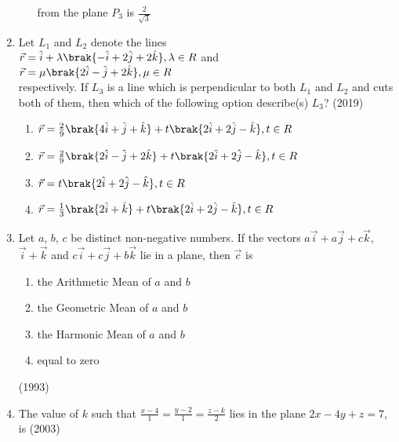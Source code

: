 \begin{enumerate}[label=\thesubsection.\arabic*.,ref=\thesubsection.\theenumi]
\begin{enumerate}
				from the plane $P_3$ is $\frac{2}{\sqrt{3}}$
		\end{enumerate}
	\item Let $L_1$ and $L_2$ denote the lines\\ $\vec{r}=\hat{i}+\lambda\brak{-\hat{i}+2\hat{j}+2\hat{k}}, \lambda \in R$ and \\
		$\vec{r}=\mu \brak{2\hat{i}-\hat{j}+2\hat{k}}, \mu \in R$\\ respectively. If $L_3$ is a line which is perpendicular to both $L_1$ and $L_2$ and cuts both of them, then which of 
		the following option describe(s) $L_3$? \hfill{(2019)}
		\begin{enumerate}
			\item $\vec{r}=\frac{2}{9}\brak{4\hat{i}+\hat{j}+\hat{k}}+t\brak{2\hat{i}+2\hat{j}-\hat{k}},t \in R$
			\item $\vec{r}=\frac{2}{9}\brak{2\hat{i}-\hat{j}+2\hat{k}}+t\brak{2\hat{i}+2\hat{j}-\hat{k}}, t \in R$
			\item $\vec{r}=t\brak{2\hat{i}+2\hat{j}-\hat{k}},t \in R$
			\item $\vec{r}=\frac{1}{3}\brak{2\hat{i}+\hat{k}}+t\brak{2\hat{i}+2\hat{j}-\hat{k}},t \in R$
		\end{enumerate}
\item Let ${a}$, ${b}$, ${c}$ be distinct non-negative numbers. If the vectors $a\vec{i} + a\vec{j} + c\vec{k}$, $\vec{i}+\vec{k}$ and $c\vec{i}+c\vec{j}+b\vec{k}$ lie in a plane, then $\vec{c}$ is
\begin{multicols}{2}
\begin{enumerate}
\item the Arithmetic Mean of ${a}$ and ${b}$
\item the Geometric Mean of ${a}$ and ${b}$
\item the Harmonic Mean of ${a}$ and ${b}$
\item equal to zero
\end{enumerate}
\end{multicols}
\hfill (1993)
\item The value of $k$ such that $\frac{x-4}{1}=\frac{y-2}{1}=\frac{z-k}{2}$ lies in the plane $2x-4y+z=7$, is
\hfill (2003)
\begin{enumerate}

\end{enumerate}
\end{enumerate}
